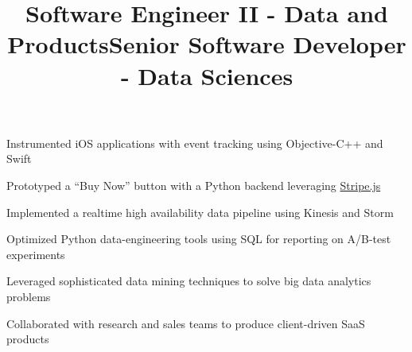 \documentclass[12pt, tweaklist, line]{res}
\let\tempone\itemize
\let\temptwo\enditemize
\renewenvironment{itemize}{\tempone\vspace{-.15in}\setlength{\topsep}{0pt}\setlength{\itemsep}{3pt}\vspace{-.15in}}{\temptwo}
\def\Cplusplus{C++}
\begin{document}
\begin{resume}
\pagebreak



\title{Software Engineer II - Data and Products}
\begin{position}
\begin{itemize}
\item Instrumented iOS applications with event tracking using Objective-C++ and Swift
\item Prototyped a ``Buy Now'' button with a Python backend leveraging \href{https://stripe.com/}{Stripe.js} %
\item Implemented a realtime high availability data pipeline using Kinesis and Storm
\item Optimized Python data-engineering tools using SQL for reporting on A/B-test experiments %
\end{itemize}
\end{position}

\title{Senior Software Developer - Data Sciences}
\begin{position}
\begin{itemize}
\item Leveraged sophisticated data mining techniques to solve big data analytics problems
\item Collaborated with research and sales teams to produce client-driven SaaS products
\end{itemize}
\end{position}


\end{resume}
\end{document}
